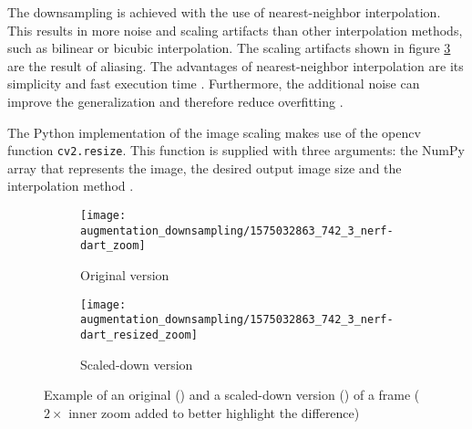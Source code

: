 The downsampling is achieved with the use of nearest-neighbor interpolation.
This results in more noise and scaling artifacts than other interpolation methods, such as bilinear or bicubic interpolation.
The scaling artifacts shown in figure \ref{fig:augmentation_downsampling} are the result of aliasing.
The advantages of nearest-neighbor interpolation are its simplicity and fast execution time \cite{training_interpolation}.
Furthermore, the additional noise can improve the generalization and therefore reduce overfitting \cite{training_noise}.

The Python implementation of the image scaling makes use of the \acrshort{opencv} function \texttt{cv2.resize}.
This function is supplied with three arguments: the NumPy array that represents the image, the desired output image size and the interpolation method \cite{training_opencv_resize}.


\begin{figure}
  \centering
  \begin{subfigure}[b]{0.45\textwidth}
    \centering
    \texttt{[image: augmentation\_downsampling/1575032863\_742\_3\_nerf-dart\_zoom]}
    \caption{Original version}
    \label{subfig:ad_original}
  \end{subfigure}
  \begin{subfigure}[b]{0.45\textwidth}
    \centering
    \texttt{[image: augmentation\_downsampling/1575032863\_742\_3\_nerf-dart\_resized\_zoom]}
    \caption{Scaled-down version}
    \label{subfig:ad_resized}
  \end{subfigure}
  \caption{Example of an original () and a scaled-down version () of a frame ($2\times$ inner zoom added to better highlight the difference)}
  \label{fig:augmentation_downsampling}
\end{figure}

